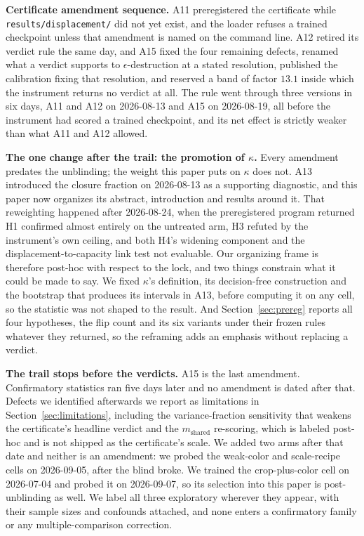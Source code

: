 \documentclass[10pt]{article}
\begin{document}
\textbf{Certificate amendment sequence.} A11 preregistered the certificate while
\texttt{results/displacement/} did not yet exist, and the loader refuses a trained checkpoint unless
that amendment is named on the command line. A12 retired its verdict rule the same day, and A15
fixed the four remaining defects, renamed what a verdict supports to $\epsilon$-destruction at a
stated resolution, published the calibration fixing that resolution, and reserved a band of factor
$13.1$ inside which the instrument returns no verdict at all. The rule
went through three versions in six days, A11 and A12 on 2026-08-13 and A15 on 2026-08-19,
all before the instrument had scored a trained checkpoint, and its net effect is strictly weaker
than what A11 and A12 allowed.

\textbf{The one change after the trail: the promotion of $\kappa$.} Every amendment predates the
unblinding; the weight this paper puts on $\kappa$ does not. A13 introduced the closure fraction
on 2026-08-13 as a supporting diagnostic, and this paper now organizes its abstract, introduction
and results around it. That reweighting happened after 2026-08-24, when the preregistered program
returned H1
confirmed almost entirely on the untreated arm, H3 refuted by the instrument's own ceiling, and both
H4's widening component and the displacement-to-capacity link test not evaluable. Our organizing
frame is therefore post-hoc with respect to the lock, and two things constrain what it could be
made to say. We fixed $\kappa$'s definition, its decision-free construction and the bootstrap that
produces its intervals in A13, before computing it on any cell, so the statistic was not shaped to
the result. And Section~\ref{sec:prereg} reports all four hypotheses, the flip count and its six
variants under their frozen rules whatever they returned, so the reframing adds an emphasis without
replacing a verdict.

\textbf{The trail stops before the verdicts.} A15 is the last amendment. Confirmatory statistics ran
five days later and no amendment is dated after that. Defects we identified afterwards we report as
limitations in Section~\ref{sec:limitations}, including the variance-fraction
sensitivity that weakens the certificate's headline verdict and the $m_{\mathrm{shared}}$
re-scoring, which is labeled post-hoc and is not shipped as the certificate's scale. We added two
arms after that date and neither is an amendment: we probed the weak-color and scale-recipe cells on
2026-09-05, after the blind broke. We trained the crop-plus-color cell on 2026-07-04 and
probed it on 2026-09-07, so its selection into this paper is post-unblinding as well. We label all
three exploratory wherever they appear, with their sample sizes and confounds attached, and none
enters a confirmatory family or any multiple-comparison correction.
\end{document}
